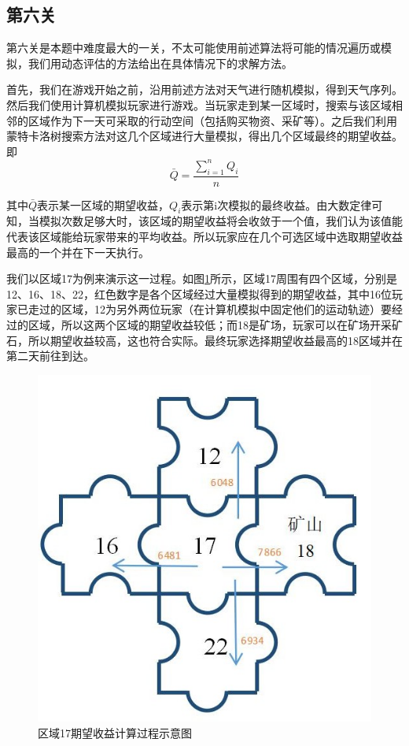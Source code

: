 \documentclass[withoutpreface,bwprint]{cumcmthesis} %
\begin{document}
\subsection{第六关}
第六关是本题中难度最大的一关，不太可能使用前述算法将可能的情况遍历或模拟，我们用动态评估的方法给出在具体情况下的求解方法。

首先，我们在游戏开始之前，沿用前述方法对天气进行随机模拟，得到天气序列。然后我们使用计算机模拟玩家进行游戏。当玩家走到某一区域时，搜索与该区域相邻的区域作为下一天可采取的行动空间（包括购买物资、采矿等）。之后我们利用蒙特卡洛树搜索方法对这几个区域进行大量模拟，得出几个区域最终的期望收益。即
\begin{equation}
\bar{Q}=\displaystyle\frac{\sum_{i=1}^{n}Q_i}{n}
\end{equation}

其中$\bar{Q}$表示某一区域的期望收益，$Q_i$表示第i次模拟的最终收益。由大数定律可知，当模拟次数足够大时，该区域的期望收益将会收敛于一个值，我们认为该值能代表该区域能给玩家带来的平均收益。所以玩家应在几个可选区域中选取期望收益最高的一个并在下一天执行。

我们以区域17为例来演示这一过程。如图\ref{fig:map6score}所示，区域17周围有四个区域，分别是12、16、18、22，红色数字是各个区域经过大量模拟得到的期望收益，其中16位玩家已走过的区域，12为另外两位玩家（在计算机模拟中固定他们的运动轨迹）要经过的区域，所以这两个区域的期望收益较低；而18是矿场，玩家可以在矿场开采矿石，所以期望收益较高，这也符合实际。最终玩家选择期望收益最高的18区域并在第二天前往到达。


\begin{figure}[H]
	\centering
	\includegraphics[scale=0.7]{figures/map6score}
	\caption{区域17期望收益计算过程示意图}
	\label{fig:map6score}
\end{figure}
\end{document}
